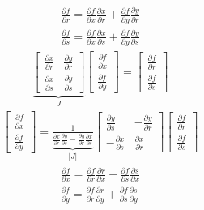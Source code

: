 \documentclass[11pt]{article}
\begin{document}
\begin{align}
\frac{\partial f}{\partial r} = \frac{\partial f}{\partial x} \frac{\partial x}{\partial r} + \frac{\partial f}{\partial y} \frac{\partial y}{\partial r} \\
\frac{\partial f}{\partial s} = \frac{\partial f}{\partial x} \frac{\partial x}{\partial s} + \frac{\partial f}{\partial y} \frac{\partial y}{\partial s}
\end{align}
\begin{align}
\underbrace{\begin{bmatrix}\frac{\partial x}{\partial r} & \frac{\partial y}{\partial r} \\[5pt] \frac{\partial x}{\partial s} & \frac{\partial y}{\partial s}\end{bmatrix}}_{J}\begin{bmatrix} \frac{\partial f}{\partial x} \\[5pt] \frac{\partial f}{\partial y} \end{bmatrix} = \begin{bmatrix} \frac{\partial f}{\partial r} \\[5pt] \frac{\partial f}{\partial s} \end{bmatrix}
\end{align}
\begin{align}
\begin{bmatrix} \frac{\partial f}{\partial x} \\[5pt] \frac{\partial f}{\partial y} \end{bmatrix} = \underbrace{\frac{1}{\frac{\partial x}{\partial r}\frac{\partial y}{\partial s} - \frac{\partial y}{\partial r}\frac{\partial x}{\partial s}}}_{|J|}\begin{bmatrix}\frac{\partial y}{\partial s} & -\frac{\partial y}{\partial r} \\[5pt] -\frac{\partial x}{\partial s} & \frac{\partial x}{\partial r}\end{bmatrix}\begin{bmatrix} \frac{\partial f}{\partial r} \\[5pt] \frac{\partial f}{\partial s} \end{bmatrix}
\end{align}
\begin{align}
\frac{\partial f}{\partial x} = \frac{\partial f}{\partial r} \frac{\partial r}{\partial x} + \frac{\partial f}{\partial s} \frac{\partial s}{\partial x} \\
\frac{\partial f}{\partial y} = \frac{\partial f}{\partial r} \frac{\partial r}{\partial y} + \frac{\partial f}{\partial s} \frac{\partial s}{\partial y}
\end{align}
\end{document}
